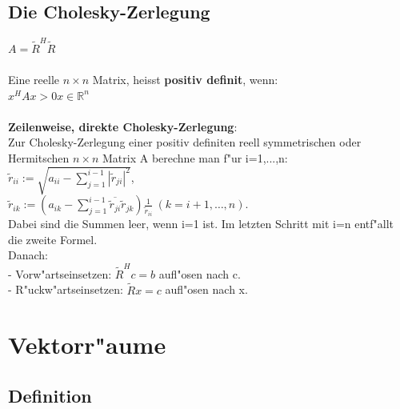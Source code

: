 \documentclass[10pt, a4paper, twocolumn]{scrartcl}
\begin{document}
\subsection{Die Cholesky-Zerlegung}

$A=\widetilde{R}^H\widetilde{R}$\\\\

Eine reelle $n\times n$ Matrix, heisst {\bf positiv definit}, wenn:\\
$x^HAx>0$\:\:$x\in\mathbb{R}^n$\\\\

{\bf Zeilenweise, direkte Cholesky-Zerlegung}:\\
Zur Cholesky-Zerlegung einer positiv definiten reell symmetrischen oder Hermitschen $n\times n$ Matrix A berechne man f"ur i=1,...,n:\\
$\widetilde{r}_{ii}:=\sqrt{a_{ii}-\sum^{i-1}_{j=1}|\widetilde{r}_{ji}|^2}$,\\
$\widetilde{r}_{ik}:=(a_{ik}-\sum^{i-1}_{j=1}\overline{\widetilde{r}_{ji}}\widetilde{r}_{jk})\frac{1}{\widetilde{r}_{ii}}\:(k=i+1,\ldots,n).$\\
Dabei sind die Summen leer, wenn i=1 ist. Im letzten Schritt mit i=n entf"allt die zweite Formel.\\
Danach:\\
- Vorw"artseinsetzen: $\widetilde{R}^Hc=b$ aufl"osen nach c.\\
- R"uckw"artseinsetzen: $\widetilde{R}x=c$ aufl"osen nach x.\\

\section{Vektorr"aume}

\subsection{Definition}
\end{document}
